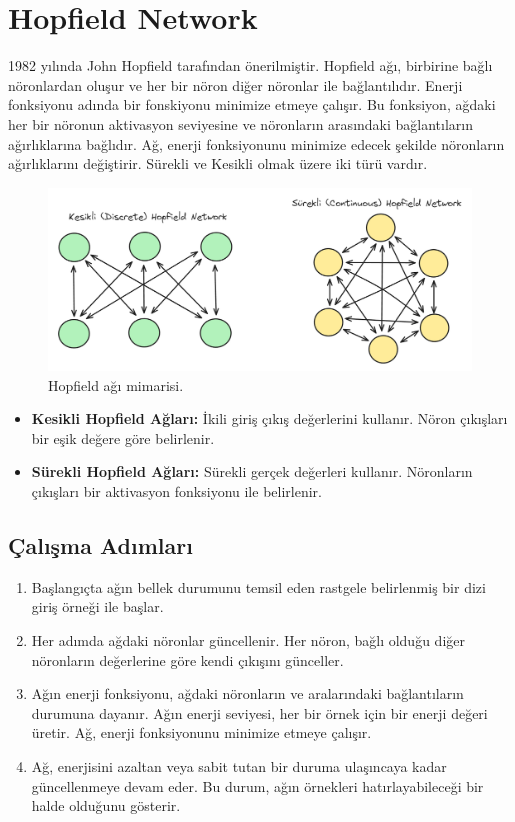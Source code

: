 \section{Hopfield Network}
1982 yılında John Hopfield tarafından önerilmiştir. Hopfield ağı, birbirine bağlı nöronlardan oluşur ve her bir nöron diğer nöronlar ile bağlantılıdır. Enerji fonksiyonu adında bir fonskiyonu minimize etmeye çalışır. Bu fonksiyon, ağdaki her bir nöronun aktivasyon seviyesine ve nöronların arasındaki bağlantıların ağırlıklarına bağlıdır. Ağ, enerji fonksiyonunu minimize edecek şekilde nöronların ağırlıklarını değiştirir. Sürekli ve Kesikli olmak üzere iki türü vardır.

\begin{figure}[h]
    \centering
    \includegraphics[width=1\textwidth]{images/hopfield_networks.png}
    \caption{Hopfield ağı mimarisi.}
    \label{fig:enter-label}
\end{figure}

\begin{itemize}
    \item \textbf{Kesikli Hopfield Ağları:} İkili giriş çıkış değerlerini kullanır. Nöron çıkışları bir eşik değere göre belirlenir. 
    \item \textbf{Sürekli Hopfield Ağları:} Sürekli gerçek değerleri kullanır. Nöronların çıkışları bir aktivasyon fonksiyonu ile belirlenir.
\end{itemize}

\subsection{Çalışma Adımları}
\begin{enumerate}
    \item Başlangıçta ağın bellek durumunu temsil eden rastgele belirlenmiş bir dizi giriş örneği ile başlar.
    \item Her adımda ağdaki nöronlar güncellenir. Her nöron, bağlı olduğu diğer nöronların değerlerine göre kendi çıkışını günceller.
    \item Ağın enerji fonksiyonu, ağdaki nöronların ve aralarındaki bağlantıların durumuna dayanır. Ağın enerji seviyesi, her bir örnek için bir enerji değeri üretir. Ağ, enerji fonksiyonunu minimize etmeye çalışır.
    \item Ağ, enerjisini azaltan veya sabit tutan bir duruma ulaşıncaya kadar güncellenmeye devam eder. Bu durum, ağın örnekleri hatırlayabileceği bir halde olduğunu gösterir.
\end{enumerate}

\newpage